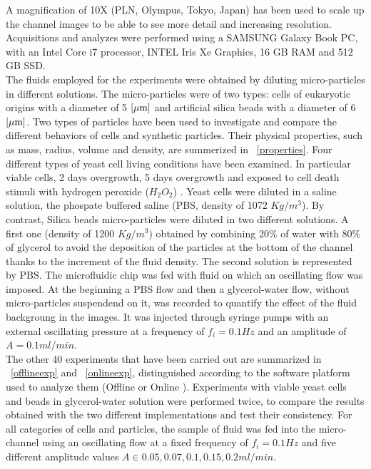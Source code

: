 \documentclass[journal]{IEEEtran}
\theoremstyle{definition}
\theoremstyle{remark}
\begin{document}
A magnification of 10X (PLN, Olympus, Tokyo, Japan) has been used to scale up the channel images to be able to see more detail and increasing resolution.
Acquisitions and analyzes were performed using a SAMSUNG Galaxy Book PC, with an Intel Core i7 processor, INTEL Iris Xe Graphics, 16 GB RAM and 512 GB SSD.
\\The fluids employed for the experiments were obtained by diluting micro-particles in different solutions. The micro-particles were of two types: cells of eukaryotic origins with a diameter of 5 $[\rm\mu m]$ and artificial silica beads with a diameter of 6 $[\rm\mu m]$. Two types of particles have been used to investigate and compare the different behaviors of cells and synthetic particles. Their physical properties, such as mass, radius, volume and density, are summerized in ~\tab\ref{properties}. Four different types of yeast cell living conditions have been examined. In particular viable cells, 2 days overgrowth, 5 days overgrowth and exposed to cell death stimuli with hydrogen peroxide ($H_2O_2$) . 
Yeast cells were diluted in a saline solution, the phospate buffered saline (PBS, density of 1072 $Kg/m^3$). By contrast, Silica beads micro-particles were diluted in two different solutions. A first one (density of 1200 $Kg/m^3$) obtained by combining 20\% of water with 80\% of glycerol to avoid the deposition of the particles at the bottom of the channel thanks to the increment of the fluid density. The second solution is represented by PBS.
The microfluidic chip was fed with fluid on which an oscillating flow was imposed.
At the beginning a PBS flow and then a glycerol-water flow, without micro-particles suspendend on it, was recorded to quantify the effect of the fluid backgroung in the images. It was injected through syringe pumps with an external oscillating pressure at a frequency of $f_i= 0.1 Hz$ and an amplitude of $A=0.1 ml/min$.  
\\The other 40 experiments that have been carried out are summarized in ~\tab\ref{offlineexp} and ~\tab\ref{onlineexp}, distinguished according to the software platform used to analyze them (Offline or Online ). Experiments with viable yeast cells and beads in glycerol-water solution were performed twice, to compare the results obtained with the two different implementations and test their consistency.
For all categories of cells and particles, the sample of fluid was fed into the micro-channel using an oscillating flow at a fixed frequency of $f_i= 0.1 Hz$ and five different amplitude values $A \in{0.05, 0.07, 0.1, 0.15, 0.2 ml/min}$. 
\end{document}
